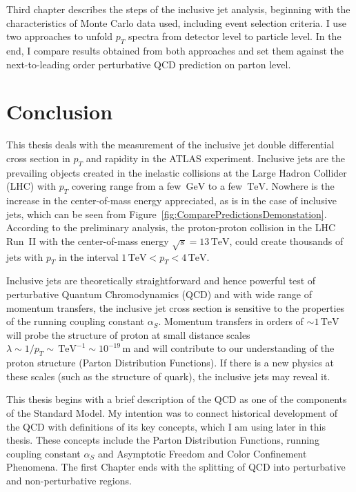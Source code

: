 \documentclass[a4paper,11pt,twoside,openright]{book}
\newcommand{\TeV}{\,\text{TeV}}
\newcommand{\GeV}{\,\text{GeV}}
\newcommand{\pt}{p_{T}}
\begin{document}
Third chapter describes the steps of the inclusive jet analysis, beginning with
the characteristics of Monte Carlo data used, including event selection 
criteria. I use two approaches to unfold $\pt$ spectra from
detector level to particle level. In the end, I compare results obtained from
both approaches and set them against the next-to-leading order perturbative QCD
prediction on parton level.





\chapter*{Conclusion}

This thesis deals with the measurement of the inclusive jet double differential
cross section in $\pt$ and rapidity in the ATLAS experiment. Inclusive jets are
the prevailing objects created in the inelastic collisions at the Large Hadron
Collider (LHC) with $\pt$
covering range from a few $\GeV$ to a few $\TeV$. Nowhere is the increase in the
center-of-mass energy appreciated, as is in the case of inclusive jets, which can
be seen from Figure~\ref{fig:ComparePredictionsDemonstation}. According to the
preliminary analysis, the proton-proton collision in the LHC Run~II with the center-of-mass
energy $\sqrt{s} = 13\TeV$, could create thousands of jets with $\pt$ in the
interval $1\TeV < \pt < 4\TeV$.

Inclusive jets are theoretically straightforward and hence powerful test of
perturbative Quantum Chromodynamics (QCD) and with wide range of 
momentum transfers, the inclusive jet cross section is sensitive to the
properties of the running coupling constant $\alpha_S$.  Momentum transfers in
orders of $\sim 1 \TeV$ will probe the structure of proton at small distance
scales $\lambda \sim 1 / \pt \sim \TeV^{-1} \sim 10^{-19} \, \text{m}$ and will
contribute to our understanding of the proton structure (Parton Distribution
Functions). If there is a new physics at these scales (such as the
structure of quark), the inclusive jets may reveal it.

This thesis begins with a brief description of the QCD as one of the components of
the Standard Model. My intention was to connect historical development of the QCD
with definitions of its key concepts, which I am using later in this thesis.
These concepts include the Parton Distribution Functions, running coupling
constant $\alpha_S$ and Asymptotic Freedom and Color Confinement Phenomena. The
first Chapter ends with the splitting of QCD into perturbative and
non-perturbative regions.
\end{document}
